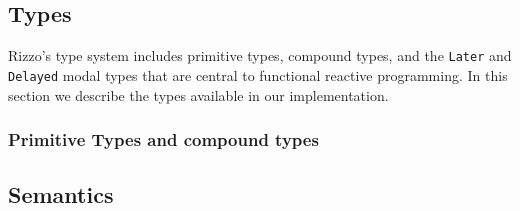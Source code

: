 \subsection{Types}\label{section:rizzolang:types}

Rizzo's type system includes primitive types, compound types, and the \texttt{Later} and \texttt{Delayed} modal types that are central to functional reactive programming. In this section we describe the types available in our implementation.


\subsubsection{Primitive Types and compound types}


\subsection{Semantics}\label{section:rizzolang:semantics}


% 
